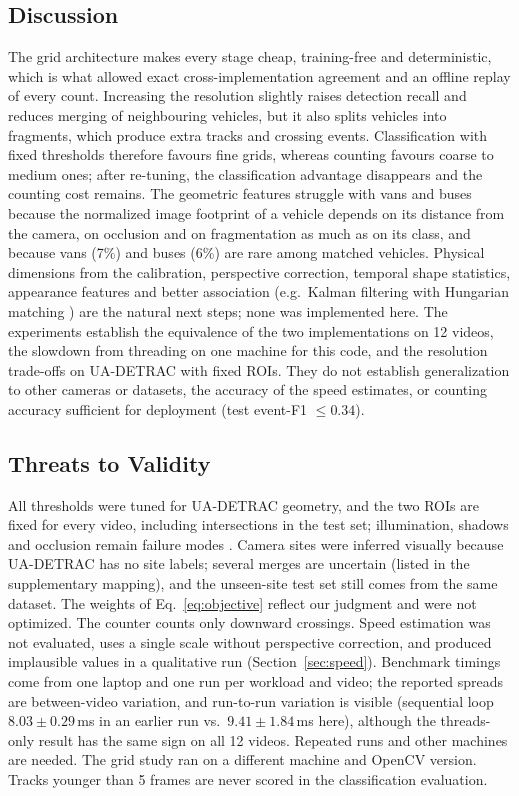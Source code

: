 \documentclass[conference]{IEEEtran}
\begin{document}
\subsection{Discussion}
\label{sec:discussion}
The grid architecture makes every stage cheap, training-free and
deterministic, which is what allowed exact cross-implementation
agreement and an offline replay of every count. Increasing the resolution
slightly raises detection recall and reduces merging of neighbouring
vehicles, but it also splits vehicles into fragments, which produce extra
tracks and crossing events. Classification with fixed thresholds
therefore favours fine grids, whereas counting favours coarse to medium
ones; after re-tuning, the classification advantage disappears and the
counting cost remains. The geometric features struggle with vans and buses
because the normalized image footprint of a vehicle depends on its
distance from the camera, on occlusion and on fragmentation as much as on
its class, and because vans (7\%) and buses (6\%) are rare among matched
vehicles. Physical dimensions from the calibration, perspective
correction, temporal shape statistics, appearance features and better
association (e.g.\ Kalman filtering with Hungarian matching
\cite{bewley2016,wojke2017}) are the natural next steps; none was
implemented here. The experiments establish the equivalence of the two
implementations on 12 videos, the slowdown from threading on one machine
for this code, and the resolution trade-offs on UA-DETRAC with fixed
ROIs. They do not establish generalization to other cameras or datasets,
the accuracy of the speed estimates, or counting accuracy sufficient for
deployment (test event-F1 $\le0.34$).

\subsection{Threats to Validity}
\label{sec:threats}
All thresholds were tuned for UA-DETRAC geometry, and the two ROIs are
fixed for every video, including intersections in the test set;
illumination, shadows and occlusion remain failure modes
\cite{abbas2021,chen2020}. Camera sites were inferred visually because
UA-DETRAC has no site labels; several merges are uncertain (listed in the
supplementary mapping), and the unseen-site test set still comes from the
same dataset. The weights of Eq.~\eqref{eq:objective} reflect our
judgment and were not optimized. The counter counts only downward
crossings. Speed estimation was not evaluated, uses a single scale without
perspective correction, and produced implausible values in a qualitative
run (Section~\ref{sec:speed}). Benchmark timings come from one laptop and
one run per workload and video; the reported spreads are between-video
variation, and run-to-run variation is visible (sequential loop
$8.03\pm0.29$\,ms in an earlier run vs.\ $9.41\pm1.84$\,ms here), although
the threads-only result has the same sign on all 12 videos. Repeated runs
\cite{kalibera2013} and other machines are needed. The grid study ran on
a different machine and OpenCV version. Tracks younger than 5 frames are
never scored in the classification evaluation.
\end{document}
